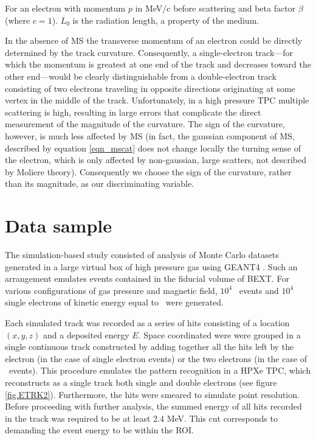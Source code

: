 \documentclass{JINST}
\begin{document}
\noindent For an electron with momentum $p$ in MeV/c before scattering and beta factor $\beta$ (where $c = 1$).  $L_{0}$ is the radiation length, a property of the medium. 

In the absence of MS the transverse momentum of an electron could be directly determined by the track
curvature. Consequently, a single-electron track---for which the momentum is greatest at one end of the
track and decreases toward the other end---would be clearly distinguishable
from a double-electron track consisting of two electrons traveling in opposite directions originating at some vertex in the middle of the track.  Unfortunately, in a high pressure TPC multiple scattering is high, resulting in large errors that complicate the direct measurement of the magnitude of the curvature. The sign of the curvature, however, is much less affected by MS (in fact, the gaussian component of MS, described by equation \ref{eqn_mscat} does not change locally the turning sense of the electron, which is only affected by non-gaussian, large scatters, not described by Moliere theory). Consequently we choose the sign of the curvature, rather than its magnitude, as our discriminating variable.  

\section{Data sample}\label{sec.track}

The simulation-based study consisted of analysis of Monte Carlo datasets generated in a large virtual box of high pressure gas using GEANT4 \cite{GEANT4}. Such an arrangement emulates events contained in the fiducial volume of BEXT. For various configurations of gas pressure and magnetic field, $10^4$ \bbonu\ events and $10^4$~ single electrons of kinetic energy equal to \Qbb\  were generated.  

Each simulated track was recorded as a series of hits consisting of a location $(x,y,z)$ and a deposited energy $E$.  Space coordinated were were grouped in a single continuous track constructed by adding together all the hits left by the electron (in the case of single electron events) or the two electrons (in the case of \bbonu\ events). This procedure emulates the pattern recognition in a HPXe TPC, which reconstructs as a single track both single and double electrons (see figure \ref{fig.ETRK2}). Furthermore, the hits were smeared to simulate point resolution. Before proceeding with further analysis, the summed energy of all hits recorded in the track was required to be at least 2.4 MeV. This cut corresponds to demanding the event energy to be within the ROI. 
\end{document}
